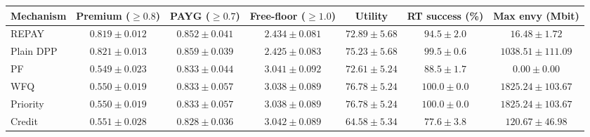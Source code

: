 \begin{tabular}{lcccccc}
\toprule
Mechanism & Premium ($\ge 0.8$) & PAYG ($\ge 0.7$) & Free-floor ($\ge 1.0$) & Utility & RT success (\%) & Max envy (Mbit) \\
\midrule
REPAY & $0.819\pm0.012$ & $0.852\pm0.041$ & $2.434\pm0.081$ & $72.89\pm5.68$ & $94.5\pm2.0$ & $16.48\pm1.72$ \\
Plain DPP & $0.821\pm0.013$ & $0.859\pm0.039$ & $2.425\pm0.083$ & $75.23\pm5.68$ & $99.5\pm0.6$ & $1038.51\pm111.09$ \\
PF & $0.549\pm0.023$ & $0.833\pm0.044$ & $3.041\pm0.092$ & $72.61\pm5.24$ & $88.5\pm1.7$ & $0.00\pm0.00$ \\
WFQ & $0.550\pm0.019$ & $0.833\pm0.057$ & $3.038\pm0.089$ & $76.78\pm5.24$ & $100.0\pm0.0$ & $1825.24\pm103.67$ \\
Priority & $0.550\pm0.019$ & $0.833\pm0.057$ & $3.038\pm0.089$ & $76.78\pm5.24$ & $100.0\pm0.0$ & $1825.24\pm103.67$ \\
Credit & $0.551\pm0.028$ & $0.828\pm0.036$ & $3.042\pm0.089$ & $64.58\pm5.34$ & $77.6\pm3.8$ & $120.67\pm46.98$ \\
\bottomrule
\end{tabular}
